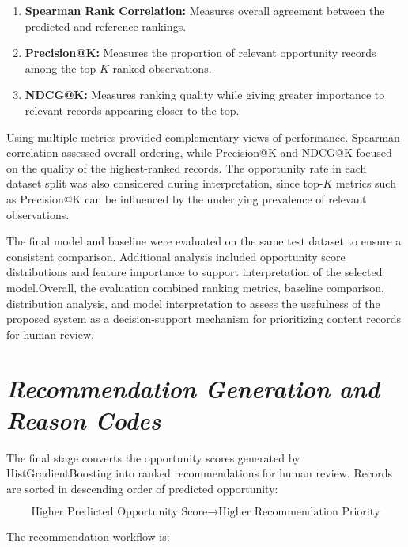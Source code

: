 \documentclass[12pt,a4paper]{report}
\begin{document}
\begin{enumerate}
    \item \textbf{Spearman Rank Correlation:} Measures overall agreement between the predicted and reference rankings.

    \item \textbf{Precision@K:} Measures the proportion of relevant opportunity records among the top $K$ ranked observations.

    \item \textbf{NDCG@K:} Measures ranking quality while giving greater importance to relevant records appearing closer to the top.
\end{enumerate}

Using multiple metrics provided complementary views of performance. Spearman correlation assessed overall ordering, while Precision@K and NDCG@K focused on the quality of the highest-ranked records. The opportunity rate in each dataset split was also considered during interpretation, since top-$K$ metrics such as Precision@K can be influenced by the underlying prevalence of relevant observations.

The final model and baseline were evaluated on the same test dataset to ensure a consistent comparison. Additional analysis included opportunity score distributions and feature importance to support interpretation of the selected model.Overall, the evaluation combined ranking metrics, baseline comparison, distribution analysis, and model interpretation to assess the usefulness of the proposed system as a decision-support mechanism for prioritizing content records for human review.

\section{\textit{Recommendation Generation and Reason Codes}}

The final stage converts the opportunity scores generated by HistGradientBoosting into ranked recommendations for human review. Records are sorted in descending order of predicted opportunity:

\begin{equation}
\text{Higher Predicted Opportunity Score}
\rightarrow
\text{Higher Recommendation Priority}
\end{equation}

The recommendation workflow is:
\end{document}
